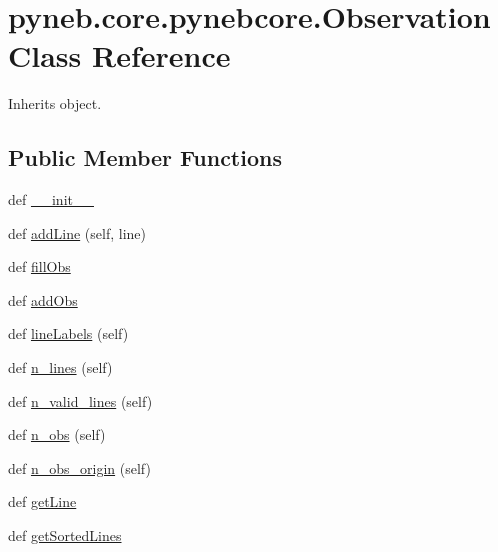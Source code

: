 \hypertarget{classpyneb_1_1core_1_1pynebcore_1_1_observation}{}\section{pyneb.\+core.\+pynebcore.\+Observation Class Reference}
\label{classpyneb_1_1core_1_1pynebcore_1_1_observation}


Inherits object.

\subsection*{Public Member Functions}
\begin{DoxyCompactItemize}
\item 
def \hyperlink{classpyneb_1_1core_1_1pynebcore_1_1_observation_a4f72b542ac93dd5376e05c7c44015409}{\+\_\+\+\_\+init\+\_\+\+\_\+}
\item 
def \hyperlink{classpyneb_1_1core_1_1pynebcore_1_1_observation_a5f4b01dbeb8d50963fb7fa21b94bfc17}{add\+Line} (self, line)
\item 
def \hyperlink{classpyneb_1_1core_1_1pynebcore_1_1_observation_a106a6b30219b5d9778713936c2a3064d}{fill\+Obs}
\item 
def \hyperlink{classpyneb_1_1core_1_1pynebcore_1_1_observation_a301e67ff50a467e97cd929039607a5d0}{add\+Obs}
\item 
def \hyperlink{classpyneb_1_1core_1_1pynebcore_1_1_observation_a6b3017332420d65de89c2d47ff51955e}{line\+Labels} (self)
\item 
def \hyperlink{classpyneb_1_1core_1_1pynebcore_1_1_observation_ac61184d33006ae92f2a3ed42adc149be}{n\+\_\+lines} (self)
\item 
def \hyperlink{classpyneb_1_1core_1_1pynebcore_1_1_observation_a7484ce35d15e5fcda49bab55c3501982}{n\+\_\+valid\+\_\+lines} (self)
\item 
def \hyperlink{classpyneb_1_1core_1_1pynebcore_1_1_observation_aef2877f7f50f5c70cee1f0da97b34081}{n\+\_\+obs} (self)
\item 
def \hyperlink{classpyneb_1_1core_1_1pynebcore_1_1_observation_ab9a38256db6dda5f5c3a9d1a7cd06d8f}{n\+\_\+obs\+\_\+origin} (self)
\item 
def \hyperlink{classpyneb_1_1core_1_1pynebcore_1_1_observation_a9994c84a500a6a31a5376ed6c7782ce3}{get\+Line}
\item 
def \hyperlink{classpyneb_1_1core_1_1pynebcore_1_1_observation_a2b18c06854c5492b53b7e91311bf1cff}{get\+Sorted\+Lines}

\end{DoxyCompactItemize}
